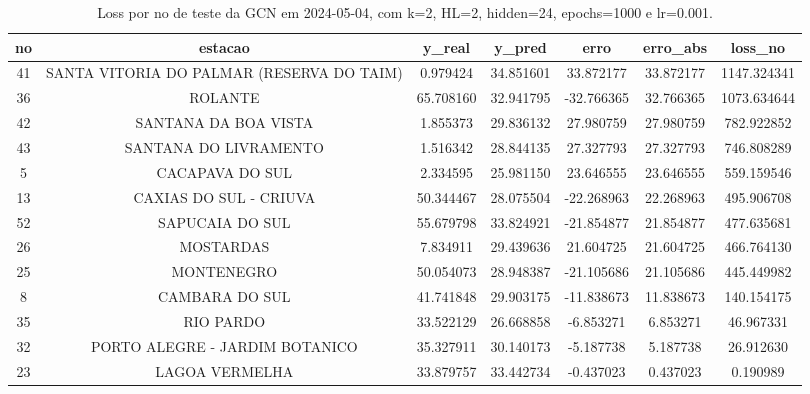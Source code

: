 \begin{table}[h]
\centering
\caption{Loss por no de teste da GCN em 2024-05-04, com k=2, HL=2, hidden=24, epochs=1000 e lr=0.001.}
\label{tab:gcn_loss_k2_hl2_h24_e1000_d20240504}
\begin{tabular}{ccccccc}
\toprule
no & estacao & y\_real & y\_pred & erro & erro\_abs & loss\_no \\
\midrule
41 & SANTA VITORIA DO PALMAR (RESERVA DO TAIM) & 0.979424 & 34.851601 & 33.872177 & 33.872177 & 1147.324341 \\
36 & ROLANTE & 65.708160 & 32.941795 & -32.766365 & 32.766365 & 1073.634644 \\
42 & SANTANA DA BOA VISTA & 1.855373 & 29.836132 & 27.980759 & 27.980759 & 782.922852 \\
43 & SANTANA DO LIVRAMENTO & 1.516342 & 28.844135 & 27.327793 & 27.327793 & 746.808289 \\
5 & CACAPAVA DO SUL & 2.334595 & 25.981150 & 23.646555 & 23.646555 & 559.159546 \\
13 & CAXIAS DO SUL - CRIUVA & 50.344467 & 28.075504 & -22.268963 & 22.268963 & 495.906708 \\
52 & SAPUCAIA DO SUL & 55.679798 & 33.824921 & -21.854877 & 21.854877 & 477.635681 \\
26 & MOSTARDAS & 7.834911 & 29.439636 & 21.604725 & 21.604725 & 466.764130 \\
25 & MONTENEGRO & 50.054073 & 28.948387 & -21.105686 & 21.105686 & 445.449982 \\
8 & CAMBARA DO SUL & 41.741848 & 29.903175 & -11.838673 & 11.838673 & 140.154175 \\
35 & RIO PARDO & 33.522129 & 26.668858 & -6.853271 & 6.853271 & 46.967331 \\
32 & PORTO ALEGRE - JARDIM BOTANICO & 35.327911 & 30.140173 & -5.187738 & 5.187738 & 26.912630 \\
23 & LAGOA VERMELHA & 33.879757 & 33.442734 & -0.437023 & 0.437023 & 0.190989 \\
\bottomrule
\end{tabular}
\end{table}
